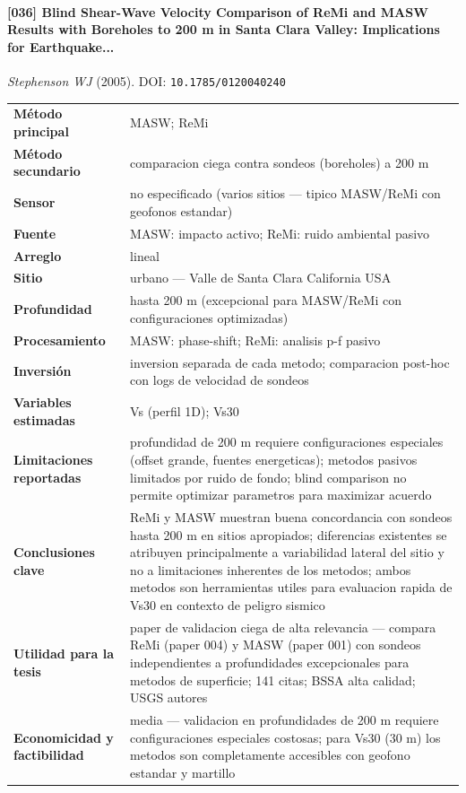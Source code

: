 \paragraph{[036] Blind Shear-Wave Velocity Comparison of ReMi and MASW Results with Boreholes to 200 m in Santa Clara Valley: Implications for Earthquake...} \emph{Stephenson WJ} (2005).
{\scriptsize DOI: \texttt{10.1785/0120040240}}

\begin{center}\scriptsize
\begin{tabularx}{\textwidth}{@{}>{\bfseries}p{3.3cm} X@{}}
\toprule
M\'etodo principal & MASW; ReMi \\
M\'etodo secundario & comparacion ciega contra sondeos (boreholes) a 200 m \\
Sensor & no especificado (varios sitios --- tipico MASW/ReMi con geofonos estandar) \\
Fuente & MASW: impacto activo; ReMi: ruido ambiental pasivo \\
Arreglo & lineal \\
Sitio & urbano --- Valle de Santa Clara California USA \\
Profundidad & hasta 200 m (excepcional para MASW/ReMi con configuraciones optimizadas) \\
Procesamiento & MASW: phase-shift; ReMi: analisis p-f pasivo \\
Inversi\'on & inversion separada de cada metodo; comparacion post-hoc con logs de velocidad de sondeos \\
Variables estimadas & Vs (perfil 1D); Vs30 \\
Limitaciones reportadas & profundidad de 200 m requiere configuraciones especiales (offset grande, fuentes energeticas); metodos pasivos limitados por ruido de fondo; blind comparison no permite optimizar parametros para maximizar acuerdo \\
Conclusiones clave & ReMi y MASW muestran buena concordancia con sondeos hasta 200 m en sitios apropiados; diferencias existentes se atribuyen principalmente a variabilidad lateral del sitio y no a limitaciones inherentes de los metodos; ambos metodos son herramientas utiles para evaluacion rapida de Vs30 en contexto de peligro sismico \\
Utilidad para la tesis & paper de validacion ciega de alta relevancia --- compara ReMi (paper 004) y MASW (paper 001) con sondeos independientes a profundidades excepcionales para metodos de superficie; 141 citas; BSSA alta calidad; USGS autores \\
Economicidad y factibilidad & media --- validacion en profundidades de 200 m requiere configuraciones especiales costosas; para Vs30 (30 m) los metodos son completamente accesibles con geofono estandar y martillo \\
\bottomrule
\end{tabularx}
\end{center}

